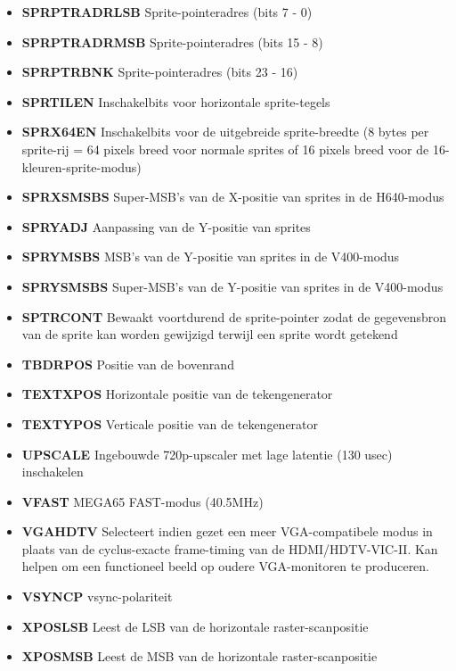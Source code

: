 \begin{itemize}
\item{\bf{SPRPTRADRLSB}} Sprite-pointeradres (bits 7 - 0)
\item{\bf{SPRPTRADRMSB}} Sprite-pointeradres (bits 15 - 8)
\item{\bf{SPRPTRBNK}} Sprite-pointeradres (bits 23 - 16)
\item{\bf{SPRTILEN}} Inschakelbits voor horizontale sprite-tegels
\item{\bf{SPRX64EN}} Inschakelbits voor de uitgebreide sprite-breedte (8 bytes per sprite-rij = 64 pixels breed voor normale sprites of 16 pixels breed voor de 16-kleuren-sprite-modus)
\item{\bf{SPRXSMSBS}} Super-MSB's van de X-positie van sprites in de H640-modus
\item{\bf{SPRYADJ}} Aanpassing van de Y-positie van sprites
\item{\bf{SPRYMSBS}} MSB's van de Y-positie van sprites in de V400-modus
\item{\bf{SPRYSMSBS}} Super-MSB's van de Y-positie van sprites in de V400-modus
\item{\bf{SPTRCONT}} Bewaakt voortdurend de sprite-pointer zodat de gegevensbron van de sprite kan worden gewijzigd terwijl een sprite wordt getekend
\item{\bf{TBDRPOS}} Positie van de bovenrand
\item{\bf{TEXTXPOS}} Horizontale positie van de tekengenerator
\item{\bf{TEXTYPOS}} Verticale positie van de tekengenerator
\item{\bf{UPSCALE}} Ingebouwde 720p-upscaler met lage latentie (130 usec) inschakelen
\item{\bf{VFAST}} MEGA65 FAST-modus (40.5MHz)
\item{\bf{VGAHDTV}} Selecteert indien gezet een meer VGA-compatibele modus in plaats van de cyclus-exacte frame-timing van de HDMI/HDTV-VIC-II. Kan helpen om een functioneel beeld op oudere VGA-monitoren te produceren.
\item{\bf{VSYNCP}} vsync-polariteit
\item{\bf{XPOSLSB}} Leest de LSB van de horizontale raster-scanpositie
\item{\bf{XPOSMSB}} Leest de MSB van de horizontale raster-scanpositie
\end{itemize}
